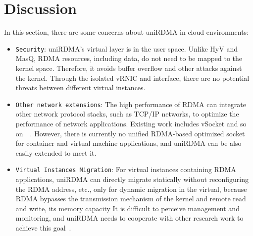\section{Discussion}
In this section, there are some concerns about uniRDMA in cloud environments:
\begin{itemize}
	\item {\verb|Security|}: uniRDMA's virtual layer is in the user space. Unlike HyV and MasQ, RDMA resources, including data, do not need to be mapped to the kernel space. Therefore, it avoids buffer overflow and other attacks against the kernel. Through the isolated vRNIC and interface, there are no potential threats between different virtual instances.
	\item {\verb|Other network extensions|}: The high performance of RDMA can integrate other network protocol stacks, such as TCP/IP networks, to optimize the performance of network applications. Existing work includes vSocket and so on~\cite{wang2019vsocket}~\cite{li2019socksdirect}. However, there is currently no unified RDMA-based optimized socket for container and virtual machine applications, and uniRDMA can be also easily extended to meet it.
	\item {\verb|Virtual Instances Migration|}: For virtual instances containing RDMA applications, uniRDMA can directly migrate statically without reconfiguring the RDMA address, etc., only for dynamic migration in the virtual, because RDMA bypasses the transmission mechanism of the kernel and remote read and write, its memory capacity It is difficult to perceive management and monitoring, and uniRDMA needs to cooperate with other research work to achieve this goal~\cite{firestone2018accelnsdi}.
\end{itemize}
